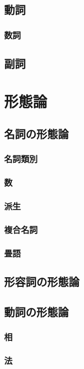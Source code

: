 \subsection{動詞}
\subsubsection{数詞}
\subsection{副詞}

\section{形態論}
\subsection{名詞の形態論}
\subsubsection{名詞類別}
\subsubsection{数}
\subsubsection{派生}
\subsubsection{複合名詞}
\subsubsection{畳語}
\subsection{形容詞の形態論}
\subsection{動詞の形態論}
\subsubsection{相}
\subsubsection{法}
